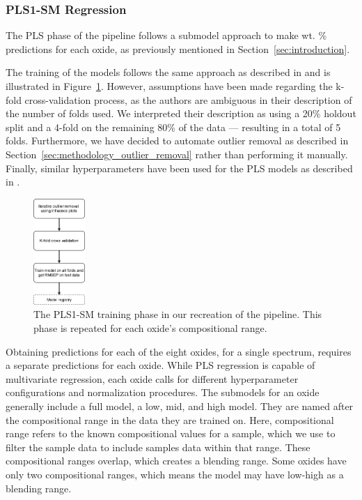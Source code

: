 \subsubsection{PLS1-SM Regression}\label{sec:methodology_pls1-sm_regression}
The PLS phase of the pipeline follows a submodel approach to make wt. \% predictions for each oxide, as previously mentioned in Section~\ref{sec:introduction}.

The training of the models follows the same approach as described in \citet{andersonImprovedAccuracyQuantitative2017} and is illustrated in Figure~\ref{fig:pls_training}.
However, assumptions have been made regarding the k-fold cross-validation process, as the authors are ambiguous in their description of the number of folds used.
We interpreted their description as using a 20\% holdout split and a 4-fold on the remaining 80\% of the data --- resulting in a total of 5 folds.
Furthermore, we have decided to automate outlier removal as described in Section~\ref{sec:methodology_outlier_removal} rather than performing it manually.
Finally, similar hyperparameters have been used for the PLS models as described in \citet{andersonImprovedAccuracyQuantitative2017}.

\begin{figure}
	\centering
	\includegraphics[width=0.175\textwidth]{images/pls_training.png}
	\caption{The PLS1-SM training phase in our recreation of the pipeline. This phase is repeated for each oxide's compositional range.}
	\label{fig:pls_training}
\end{figure}

Obtaining predictions for each of the eight oxides, for a single spectrum, requires a separate predictions for each oxide. While PLS regression is capable of multivariate regression, each oxide calls for different hyperparameter configurations and normalization procedures.
The submodels for an oxide generally include a full model, a low, mid, and high model. They are named after the compositional range in the data they are trained on. Here, compositional range refers to the known compositional values for a sample, which we use to filter the sample data to include samples data within that range.
These compositional ranges overlap, which creates a blending range.
Some oxides have only two compositional ranges, which means the model may have low-high as a blending range.

